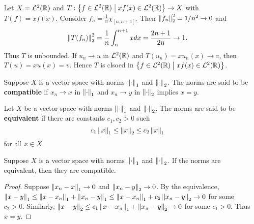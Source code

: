 \begin{example}
    Let $X = \mathcal{L}^2(\mathbb{R})$ and $T:\left\{ f\in\mathcal{L}^2(\mathbb{R}) \;\middle\vert\; xf(x)\in\mathcal{L}^2(\mathbb{R}) \right\}\to X$ with 
    $T(f) = xf(x)$. Consider $f_n = \frac{1}{n}\chi_{[n,n+1]}$. Then 
    $\left\lVert {f_n} \right\rVert_2^2 = 1/n^2\to 0$ and 
    \begin{equation*}
        \left\lVert {T(f_n)} \right\rVert_2^2 = \frac{1}{n}\int_{n}^{n+1} xdx = \frac{2n+1}{2n}\to 1.
    \end{equation*}
    Thus $T$ is unbounded. If $u_n\to u$ in $\mathcal{L}^2(\mathbb{R})$ and $T(u_n) = xu_n(x)\to v$, 
    then $T(u) = xu(x) = v$. Hence $T$ is clsoed in $\left\{ f\in\mathcal{L}^2(\mathbb{R}) \;\middle\vert\; xf(x)\in\mathcal{L}^2(\mathbb{R}) \right\}$.
\end{example}

\begin{definition}
    Suppose $X$ is a vector space with norms $\left\lVert {\cdot} \right\rVert_1$ and $\left\lVert {\cdot} \right\rVert_2$. 
    The norms are said to be \textbf{compatible} if $x_n\to x$ in $\left\lVert {\cdot} \right\rVert_1$ 
    and $x_n\to y$ in $\left\lVert {\cdot} \right\rVert_2$ implies $x=y$.
\end{definition}

\begin{definition}
    Let $X$ be a vector space with norms $\left\lVert {\cdot} \right\rVert_1$ and $\left\lVert {\cdot} \right\rVert_2$. The 
    norms are said to be \textbf{equivalent} if there are constants $c_1,c_2>0$ such 
    \begin{equation*}
        c_1\left\lVert {x} \right\rVert_1 \leq \left\lVert {x} \right\rVert_2 \leq c_2\left\lVert {x} \right\rVert_1
    \end{equation*}
    for all $x\in X$.
\end{definition}

\begin{proposition}\label{prop:equiv_compatible}
    Suppose $X$ is a vector space with norms $\left\lVert {\cdot} \right\rVert_1$ and $\left\lVert {\cdot} \right\rVert_2$. 
    If the norms are equivalent, then they are compatible.
\end{proposition}
\begin{proof}
    Suppose $\left\lVert {x_n-x} \right\rVert_1\to 0$ and $\left\lVert {x_n-y} \right\rVert_2\to 0$. By the equivalence, 
    $\left\lVert {x-y} \right\rVert_1\leq \left\lVert {x-x_n} \right\rVert_1 + \left\lVert {x_n-y} \right\rVert_1\leq \left\lVert {x-x_n} \right\rVert_1 + c_2\left\lVert {x_n-y} \right\rVert_2\to 0$ 
    for some $c_2>0$. Similarly, $\left\lVert {x-y} \right\rVert_2\leq c_1\left\lVert {x-x_n} \right\rVert_1 + \left\lVert {x_n-y} \right\rVert_2\to 0$ 
    for some $c_1>0$. Thus $x=y$.
\end{proof}

